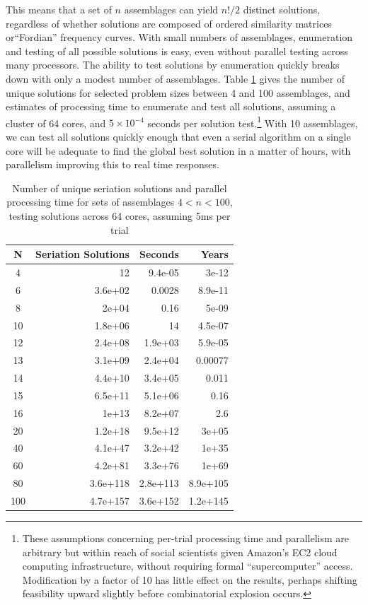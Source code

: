 This means that a set of $n$ assemblages can yield $n! / 2$ distinct solutions, regardless of whether solutions are composed of ordered similarity matrices or``Fordian'' frequency curves.  With small numbers of assemblages, enumeration and testing of all possible solutions is easy, even without parallel testing across many processors.  The ability to test solutions by enumeration quickly breaks down with only a modest number of assemblages.  Table \ref{tab:ss-stats} gives the number of unique solutions for selected problem sizes between 4 and 100 assemblages, and estimates of processing time to enumerate and test all solutions, assuming a cluster of 64 cores, and \ensuremath{5\times 10^{-4}} seconds per solution test.\footnote{These assumptions concerning per-trial processing time and parallelism are arbitrary but within reach of social scientists given Amazon's EC2 cloud computing infrastructure, without requiring formal ``supercomputer'' access.  Modification by a factor of 10 has little effect on the results, perhaps shifting feasibility upward slightly before combinatorial explosion occurs.}  With 10 assemblages, we can test all solutions quickly enough that even a serial algorithm on a single core will be adequate to find the global best solution in a matter of hours, with parallelism improving this to real time responses.  

\begin{table}[ht]
\centering
\begin{tabular}{|c|r|r|r|}
  \hline
N & Seriation Solutions & Seconds & Years \\ 
  \hline
  4 &  12 & 9.4e-05 & 3e-12 \\ 
    6 & 3.6e+02 & 0.0028 & 8.9e-11 \\ 
    8 & 2e+04 & 0.16 & 5e-09 \\ 
   10 & 1.8e+06 &  14 & 4.5e-07 \\ 
   12 & 2.4e+08 & 1.9e+03 & 5.9e-05 \\ 
   13 & 3.1e+09 & 2.4e+04 & 0.00077 \\ 
   14 & 4.4e+10 & 3.4e+05 & 0.011 \\ 
   15 & 6.5e+11 & 5.1e+06 & 0.16 \\ 
   16 & 1e+13 & 8.2e+07 & 2.6 \\ 
   20 & 1.2e+18 & 9.5e+12 & 3e+05 \\ 
   40 & 4.1e+47 & 3.2e+42 & 1e+35 \\ 
   60 & 4.2e+81 & 3.3e+76 & 1e+69 \\ 
   80 & 3.6e+118 & 2.8e+113 & 8.9e+105 \\ 
  100 & 4.7e+157 & 3.6e+152 & 1.2e+145 \\ 
   \hline
\end{tabular}
\caption{Number of unique seriation solutions and parallel processing time for sets of assemblages $4 < n < 100$, testing solutions across 64 cores, assuming 5ms per trial} 
\label{tab:ss-stats}
\end{table}

